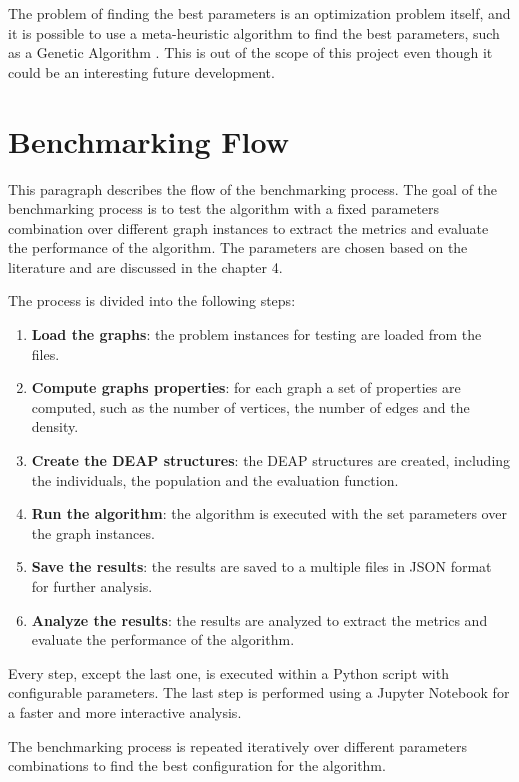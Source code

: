 The problem of finding the best parameters is an optimization problem itself, and it is possible to use a meta-heuristic algorithm to find the best parameters, such as a Genetic Algorithm \cite{meta-heuristic}. This is out of the scope of this project even though it could be an interesting future development.

\section{Benchmarking Flow}

This paragraph describes the flow of the benchmarking process. The goal of the benchmarking process is to test the algorithm with a fixed parameters combination over different graph instances to extract the metrics and evaluate the performance of the algorithm. The parameters are chosen based on the literature and are discussed in the chapter 4.

The process is divided into the following steps:

\begin{enumerate}
	\item \textbf{Load the graphs}: the problem instances for testing are loaded from the files.
	\item \textbf{Compute graphs properties}: for each graph a set of properties are computed, such as the number of vertices, the number of edges and the density.
	\item \textbf{Create the DEAP structures}: the DEAP structures are created, including the individuals, the population and the evaluation function.
	\item \textbf{Run the algorithm}: the algorithm is executed with the set parameters over the graph instances.
	\item \textbf{Save the results}: the results are saved to a multiple files in JSON format for further analysis.
	\item \textbf{Analyze the results}: the results are analyzed to extract the metrics and evaluate the performance of the algorithm.
\end{enumerate}

Every step, except the last one, is executed within a Python script with configurable parameters. The last step is performed using a Jupyter Notebook for a faster and more interactive analysis.

The benchmarking process is repeated iteratively over different parameters combinations to find the best configuration for the algorithm.

